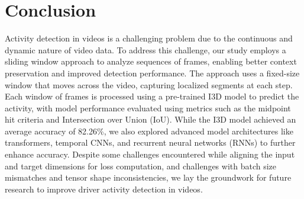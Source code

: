 \documentclass{article}
\begin{document}
\section{Conclusion}
Activity detection in videos is a challenging problem due to the continuous and dynamic nature of video data. To address this challenge, our study employs a sliding window approach to analyze sequences of frames, enabling better context preservation and improved detection performance. The approach uses a fixed-size window that moves across the video, capturing localized segments at each step. Each window of frames is processed using a pre-trained I3D model to predict the activity, with model performance evaluated using metrics such as the midpoint hit criteria and Intersection over Union (IoU). While the I3D model achieved an average accuracy of 82.26\%, we also explored advanced model architectures like transformers, temporal CNNs, and recurrent neural networks (RNNs) to further enhance accuracy. Despite some challenges encountered while aligning the input and target dimensions for loss computation, and challenges with batch size mismatches and tensor shape inconsistencies, we lay the groundwork for future research to improve driver activity detection in videos.


\end{document}
